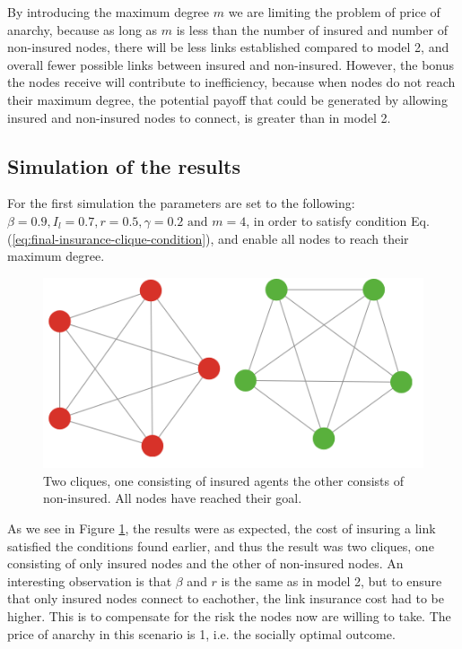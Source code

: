 By introducing the maximum degree $m$ we are limiting the problem of price of anarchy, because as long as $m$ is less than the number of insured and number of non-insured nodes, there will be less links established compared to model 2, and overall fewer possible links between insured and non-insured. However, the bonus the nodes receive will contribute to inefficiency, because when nodes do not reach their maximum degree, the potential payoff that could be generated by allowing insured and non-insured nodes to connect, is greater than in model 2.


\subsection{Simulation of the results}
For the first simulation the parameters are set to the following: $\beta=0.9, I_{l}=0.7, r=0.5, \gamma=0.2 \text{ and }m=4$, in order to satisfy condition Eq.(\ref{eq:final-insurance-clique-condition}), and enable all nodes to reach their maximum degree.  

\begin{figure}[h]
\centering
  \includegraphics[width=0.7\linewidth]{../Figures/BonusGameInsuredClique.png}
  \caption{\label{fig:bonusoptimal} Two cliques, one consisting of insured agents the other consists of non-insured. All nodes have reached their goal. }
\end{figure}
As we see in Figure \ref{fig:bonusoptimal}, the results were as expected, the cost of insuring a link satisfied the conditions found earlier, and thus the result was two cliques, one consisting of only insured nodes and the other of non-insured nodes.
An interesting observation is that $\beta$ and $r$ is the same as in model 2, but to ensure that only insured nodes connect to eachother, the link insurance cost had to be higher. This is to compensate for the risk the nodes now are willing to take. The price of anarchy in this scenario is 1, i.e. the socially optimal outcome. 

